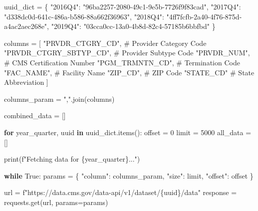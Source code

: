 \documentclass[
  letterpaper,
  DIV=11,
  numbers=noendperiod]{scrartcl}
\newenvironment{Shaded}{\begin{snugshade}}{\end{snugshade}}
\newcommand{\BuiltInTok}[1]{\textcolor[rgb]{0.00,0.23,0.31}{#1}}
\newcommand{\CommentTok}[1]{\textcolor[rgb]{0.37,0.37,0.37}{#1}}
\newcommand{\ControlFlowTok}[1]{\textcolor[rgb]{0.00,0.23,0.31}{\textbf{#1}}}
\newcommand{\DecValTok}[1]{\textcolor[rgb]{0.68,0.00,0.00}{#1}}
\newcommand{\KeywordTok}[1]{\textcolor[rgb]{0.00,0.23,0.31}{\textbf{#1}}}
\newcommand{\NormalTok}[1]{\textcolor[rgb]{0.00,0.23,0.31}{#1}}
\newcommand{\OperatorTok}[1]{\textcolor[rgb]{0.37,0.37,0.37}{#1}}
\newcommand{\SpecialCharTok}[1]{\textcolor[rgb]{0.37,0.37,0.37}{#1}}
\newcommand{\SpecialStringTok}[1]{\textcolor[rgb]{0.13,0.47,0.30}{#1}}
\newcommand{\StringTok}[1]{\textcolor[rgb]{0.13,0.47,0.30}{#1}}
\newcommand{\VariableTok}[1]{\textcolor[rgb]{0.07,0.07,0.07}{#1}}
\begin{document}
\begin{Shaded}
\begin{Highlighting}[]
\NormalTok{uuid\_dict }\OperatorTok{=}\NormalTok{ \{}
    \StringTok{"2016Q4"}\NormalTok{: }\StringTok{"96ba2257{-}2080{-}49c1{-}9e5b{-}7726f9f83cad"}\NormalTok{,}
    \StringTok{"2017Q4"}\NormalTok{: }\StringTok{"d338dc0d{-}641c{-}486a{-}b586{-}88a662f36963"}\NormalTok{,}
    \StringTok{"2018Q4"}\NormalTok{: }\StringTok{"4ff7fcfb{-}2a40{-}4f76{-}875d{-}a4ac2aec268e"}\NormalTok{,}
    \StringTok{"2019Q4"}\NormalTok{: }\StringTok{"03cca0cc{-}13a0{-}4b8d{-}82c4{-}57185b6bbfbd"}
\NormalTok{\}}

\NormalTok{columns }\OperatorTok{=}\NormalTok{ [}
    \StringTok{"PRVDR\_CTGRY\_CD"}\NormalTok{,        }\CommentTok{\# Provider Category Code}
    \StringTok{"PRVDR\_CTGRY\_SBTYP\_CD"}\NormalTok{,  }\CommentTok{\# Provider Subtype Code}
    \StringTok{"PRVDR\_NUM"}\NormalTok{,             }\CommentTok{\# CMS Certification Number}
    \StringTok{"PGM\_TRMNTN\_CD"}\NormalTok{,         }\CommentTok{\# Termination Code}
    \StringTok{"FAC\_NAME"}\NormalTok{,              }\CommentTok{\# Facility Name}
    \StringTok{"ZIP\_CD"}\NormalTok{,                }\CommentTok{\# ZIP Code}
    \StringTok{"STATE\_CD"}               \CommentTok{\# State Abbreviation}
\NormalTok{]}

\NormalTok{columns\_param }\OperatorTok{=} \StringTok{","}\NormalTok{.join(columns)}

\NormalTok{combined\_data }\OperatorTok{=}\NormalTok{ []}

\ControlFlowTok{for}\NormalTok{ year\_quarter, uuid }\KeywordTok{in}\NormalTok{ uuid\_dict.items():}
\NormalTok{    offset }\OperatorTok{=} \DecValTok{0}
\NormalTok{    limit }\OperatorTok{=} \DecValTok{5000}  
\NormalTok{    all\_data }\OperatorTok{=}\NormalTok{ []}

    \BuiltInTok{print}\NormalTok{(}\SpecialStringTok{f"Fetching data for }\SpecialCharTok{\{}\NormalTok{year\_quarter}\SpecialCharTok{\}}\SpecialStringTok{..."}\NormalTok{)}

    \ControlFlowTok{while} \VariableTok{True}\NormalTok{:}
\NormalTok{        params }\OperatorTok{=}\NormalTok{ \{}
            \StringTok{"column"}\NormalTok{: columns\_param,}
            \StringTok{"size"}\NormalTok{: limit,}
            \StringTok{"offset"}\NormalTok{: offset}
\NormalTok{        \}}

\NormalTok{        url }\OperatorTok{=} \SpecialStringTok{f"https://data.cms.gov/data{-}api/v1/dataset/}\SpecialCharTok{\{}\NormalTok{uuid}\SpecialCharTok{\}}\SpecialStringTok{/data"}
\NormalTok{        response }\OperatorTok{=}\NormalTok{ requests.get(url, params}\OperatorTok{=}\NormalTok{params)}


\end{Highlighting}
\end{Shaded}
\end{document}
